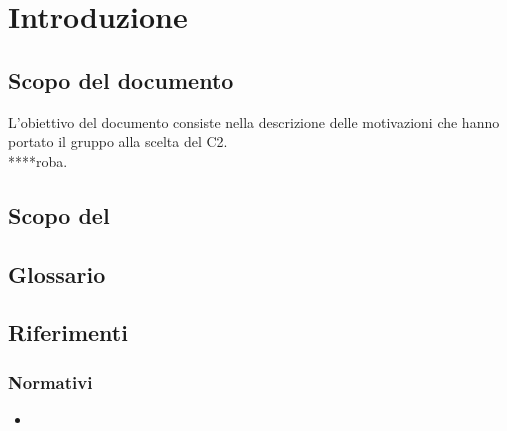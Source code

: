 \section {Introduzione}
	\subsection {Scopo del documento}
L'obiettivo del documento consiste nella descrizione delle motivazioni che 				hanno portato il gruppo \GRUPPO{} alla scelta del  C2.  \\
****roba. 
	\subsection {Scopo del }
		\SCOPO
	\subsection {Glossario}
		\GLOSSARIO
	\subsection {Riferimenti}
		\subsubsection {Normativi}
			\begin {itemize}
				\item \NPdoc
			\end {itemize}
